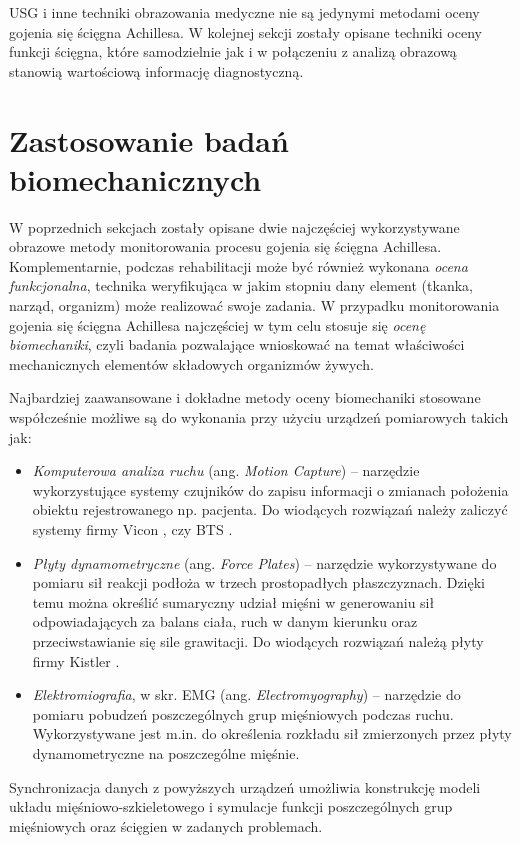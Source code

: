 USG i inne techniki obrazowania medyczne nie są jedynymi metodami oceny gojenia się ścięgna Achillesa. W kolejnej sekcji zostały opisane techniki oceny funkcji ścięgna, które samodzielnie jak i w połączeniu z analizą obrazową stanowią wartościową informację diagnostyczną.

\section{Zastosowanie badań biomechanicznych}
\label{biomechanika}
W poprzednich sekcjach zostały opisane dwie najczęściej wykorzystywane obrazowe metody monitorowania procesu gojenia się ścięgna Achillesa. Komplementarnie, podczas rehabilitacji może być również wykonana \textit{ocena funkcjonalna}, technika weryfikująca w jakim stopniu dany element (tkanka, narząd, organizm) może realizować swoje zadania. W przypadku monitorowania gojenia się ścięgna Achillesa najczęściej w tym celu stosuje się \textit{ocenę biomechaniki}, czyli badania pozwalające wnioskować na temat właściwości mechanicznych elementów składowych organizmów żywych. 

Najbardziej zaawansowane i dokładne metody oceny biomechaniki stosowane współcześnie możliwe są do wykonania przy użyciu urządzeń pomiarowych takich jak:
\begin{itemize}
	\item \textit{Komputerowa analiza ruchu} (ang. \textit{Motion Capture}) -- narzędzie wykorzystujące systemy czujników do zapisu informacji o zmianach położenia obiektu rejestrowanego np. pacjenta. Do wiodących rozwiązań należy zaliczyć systemy firmy Vicon \cite{Vicon}, czy BTS \cite{BTS}.
	\item \textit{Płyty dynamometryczne} (ang. \textit{Force Plates}) -- narzędzie wykorzystywane do pomiaru sił reakcji podłoża w trzech prostopadłych płaszczyznach. Dzięki temu można określić sumaryczny udział mięśni w generowaniu sił odpowiadających za balans ciała, ruch w danym kierunku oraz przeciwstawianie się sile grawitacji. Do wiodących rozwiązań należą płyty firmy Kistler \cite{KISTLER}.
	\item \textit{Elektromiografia}, w skr. EMG (ang. \textit{Electromyography}) -- narzędzie do pomiaru pobudzeń poszczególnych grup mięśniowych podczas ruchu. Wykorzystywane jest m.in. do określenia rozkładu sił zmierzonych przez płyty dynamometryczne na poszczególne mięśnie.
\end{itemize}

Synchronizacja danych z powyższych urządzeń umożliwia konstrukcję modeli układu mięśniowo-szkieletowego i symulacje funkcji poszczególnych grup mięśniowych oraz ścięgien w zadanych problemach.

